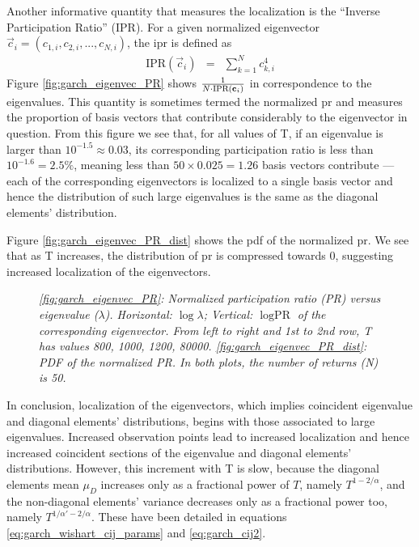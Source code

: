 \documentclass{report}
\begin{document}
Another informative quantity that measures the localization is the
``Inverse Participation Ratio'' (IPR). For a given normalized eigenvector
$\vec{c}_i = (c_{1, i}, c_{2, i}, ..., c_{N, i})$, the \gls{ipr} is defined
as \cite{Aberg2013}
\begin{eqnarray}
  \text{IPR}(\vec{c}_i) &=& \sum_{k=1}^N c_{k,i}^4 \label{eq:IPR_def}
\end{eqnarray}
Figure \ref{fig:garch_eigenvec_PR} shows ${1 \over
  N \cdot \text{IPR}(\vec{c}_i)}$ in correspondence to the
eigenvalues. This quantity is sometimes termed the
normalized \gls{pr} and measures the proportion of
basis vectors that contribute considerably to the eigenvector in
question. From this figure we see that, for all values of T, if an
eigenvalue is larger than $10^{-1.5} \approx 0.03$, its corresponding
participation ratio is less than $10^{-1.6} = 2.5\%$, meaning less
than $50 \times 0.025 = 1.26$ basis vectors contribute --- each of the
corresponding eigenvectors is localized to a single basis vector and
hence the distribution of such large eigenvalues is the same as the
diagonal elements' distribution.

Figure \ref{fig:garch_eigenvec_PR_dist} shows the \gls{pdf} of the
normalized \gls{pr}. We see that as T increases, the distribution of
\gls{pr} is compressed towards 0, suggesting increased localization of
the eigenvectors.
\begin{figure}[htb!]
  \centering
  \caption{\small \it \ref{fig:garch_eigenvec_PR}: Normalized
    participation ratio (PR) versus eigenvalue
    ($\lambda$). Horizontal: $\log \lambda$; Vertical: $\log
    \text{PR}$ of the corresponding
    eigenvector. From left to right and 1st to 2nd row, T has values
    800, 1000, 1200, 80000. \ref{fig:garch_eigenvec_PR_dist}: PDF of
    the normalized PR. In both plots, the number of returns (N) is
    50.}
\end{figure}
In conclusion, localization of the eigenvectors, which implies 
coincident eigenvalue and diagonal elements' distributions, begins with
those associated to large eigenvalues. Increased observation points
lead to increased localization and hence increased coincident sections
of the eigenvalue and diagonal elements' distributions. However, this
increment with T is slow, because the diagonal elements mean $\mu_D$
increases only as a fractional power of $T$, namely $T^{1 -
  2/\alpha}$, and the non-diagonal elements' variance decreases only
as a fractional power too, namely $T^{1/\alpha' - 2/\alpha}$. These
have been detailed in equations \ref{eq:garch_wishart_cij_params} and
\ref{eq:garch_cij2}.
\end{document}
